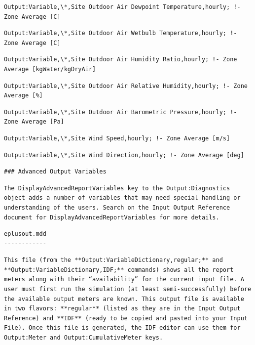 \begin{lstlisting}
Output:Variable,\*,Site Outdoor Air Dewpoint Temperature,hourly; !- Zone Average [C]
\end{lstlisting}

\begin{lstlisting}
Output:Variable,\*,Site Outdoor Air Wetbulb Temperature,hourly; !- Zone Average [C]
\end{lstlisting}

\begin{lstlisting}
Output:Variable,\*,Site Outdoor Air Humidity Ratio,hourly; !- Zone Average [kgWater/kgDryAir]
\end{lstlisting}

\begin{lstlisting}
Output:Variable,\*,Site Outdoor Air Relative Humidity,hourly; !- Zone Average [%]
\end{lstlisting}

\begin{lstlisting}
Output:Variable,\*,Site Outdoor Air Barometric Pressure,hourly; !- Zone Average [Pa]
\end{lstlisting}

\begin{lstlisting}
Output:Variable,\*,Site Wind Speed,hourly; !- Zone Average [m/s]
\end{lstlisting}

\begin{lstlisting}
Output:Variable,\*,Site Wind Direction,hourly; !- Zone Average [deg]
\end{lstlisting}

\begin{lstlisting}
### Advanced Output Variables
\end{lstlisting}

\begin{lstlisting}
The DisplayAdvancedReportVariables key to the Output:Diagnostics object adds a number of variables that may need special handling or understanding of the users. Search on the Input Output Reference document for DisplayAdvancedReportVariables for more details.
\end{lstlisting}

\begin{lstlisting}
eplusout.mdd
------------
\end{lstlisting}

\begin{lstlisting}
This file (from the **Output:VariableDictionary,regular;** and **Output:VariableDictionary,IDF;** commands) shows all the report meters along with their “availability” for the current input file. A user must first run the simulation (at least semi-successfully) before the available output meters are known. This output file is available in two flavors: **regular** (listed as they are in the Input Output Reference) and **IDF** (ready to be copied and pasted into your Input File). Once this file is generated, the IDF editor can use them for Output:Meter and Output:CumulativeMeter keys.
\end{lstlisting}

